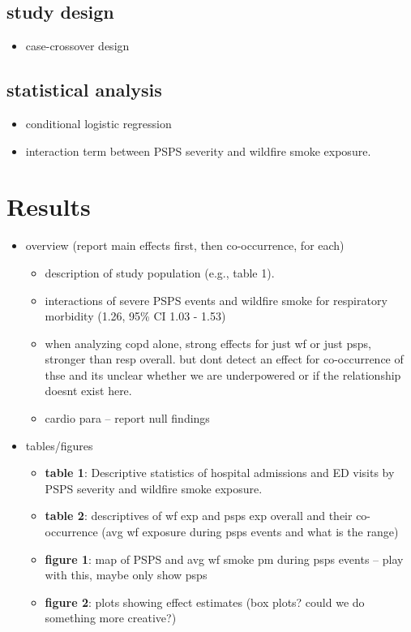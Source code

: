 \documentclass[../main.tex]{subfiles}
\begin{document}
    \subsection{study design}
    \begin{itemize}
        \item case-crossover design
    \end{itemize}
    
    \subsection{statistical analysis}
    \begin{itemize}
        \item conditional logistic regression 
        \item interaction term between PSPS severity and wildfire smoke exposure.
    \end{itemize}


\section{Results}
\begin{itemize}
    \item overview (report main effects first, then co-occurrence, for each)
    \begin{itemize}
        \item description of study population (e.g., table 1).
        \item interactions of severe PSPS events and wildfire smoke for respiratory morbidity (1.26, 95\% CI 1.03 - 1.53)
        \item when analyzing copd alone, strong effects for just wf or just psps, stronger than resp overall. but dont detect an effect for co-occurrence of thse and its unclear whether we are underpowered or if the relationship doesnt exist here. 
        \item cardio para -- report null findings 
    \end{itemize}
    \item tables/figures
    \begin{itemize}
        \item \textbf{table 1}: Descriptive statistics of hospital admissions and ED visits by PSPS severity and wildfire smoke exposure.
        \item \textbf{table 2}: descriptives of wf exp and psps exp overall and their co-occurrence (avg wf exposure during psps events and what is the range) 
        \item \textbf{figure 1}: map of PSPS and avg wf smoke pm during psps events -- play with this, maybe only show psps  
        \item \textbf{figure 2}: plots showing effect estimates (box plots? could we do something more creative?) 
    \end{itemize}
\end{itemize}
\end{document}
